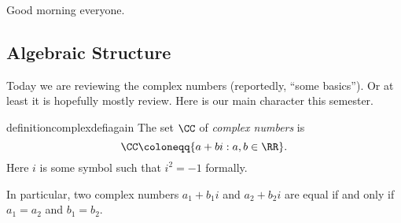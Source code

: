 
Good morning everyone.

\subsection{Algebraic Structure}
Today we are reviewing the complex numbers (reportedly, ``some basics''). Or at least it is hopefully mostly review. Here is our main character this semester.
\begin{restatable}{definition}{complexdefiagain}
	The set $\CC$ of \textit{complex numbers} is
	\[\CC\coloneqq \{a+bi:a,b\in\RR\}.\]
	Here $i$ is some symbol such that $i^2=-1$ formally.
\end{restatable}
\noindent In particular, two complex numbers $a_1+b_1i$ and $a_2+b_2i$ are equal if and only if $a_1=a_2$ and $b_1=b_2$.

